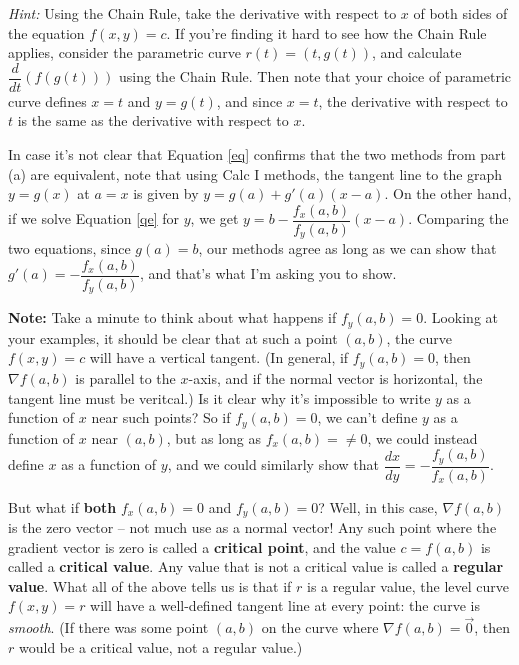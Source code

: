 \documentclass[letterpaper,12pt]{article}
\begin{document}
\begin{enumerate}
\begin{enumerate}
\medskip

{\em Hint:} Using the Chain Rule, take the derivative with respect to $x$ of both sides of the equation $f(x,y)=c$. If you're finding it hard to see how the Chain Rule applies, consider the parametric curve $r(t) = (t,g(t))$, and calculate $\dfrac{d}{dt}(f(g(t)))$ using the Chain Rule. Then note that your choice of parametric curve defines $x=t$ and $y=g(t)$, and since $x=t$, the derivative with respect to $t$ is the same as the derivative with respect to $x$.

\medskip

In case it's not clear that Equation \eqref{eq} confirms that the two methods from part (a) are equivalent, note that using Calc I methods, the tangent line to the graph $y=g(x)$ at $a=x$ is given by $y=g(a) + g'(a)(x-a)$. On the other hand, if we solve Equation \eqref{qe} for $y$, we get $y = b-\dfrac{f_x(a,b)}{f_y(a,b)}(x-a)$. Comparing the two equations, since $g(a)=b$, our methods agree as long as we can show that $g'(a) = -\dfrac{f_x(a,b)}{f_y(a,b)}$, and that's what I'm asking you to show.
\end{enumerate}
\newpage

{\bf Note:} Take a minute to think about what happens if $f_y(a,b)=0$. Looking at your examples, it should be clear that at such a point $(a,b)$, the curve $f(x,y)=c$ will have a vertical tangent. (In general, if $f_y(a,b)=0$, then $\nabla f(a,b)$ is parallel to the $x$-axis, and if the normal vector is horizontal, the tangent line must be veritcal.) Is it clear why it's impossible to write $y$ as a function of $x$ near such points? So if $f_y(a,b)=0$, we can't define $y$ as a function of $x$ near $(a,b)$, but as long as $f_x(a,b)=\neq 0$, we could instead define $x$ as a function of $y$, and we could similarly show that $\dfrac{dx}{dy} = -\dfrac{f_y(a,b)}{f_x(a,b)}$.

But what if {\bf both} $f_x(a,b)=0$ and $f_y(a,b)=0$? Well, in this case, $\nabla f(a,b)$ is the zero vector -- not much use as a normal vector! Any such point where the gradient vector is zero is called a {\bf critical point}, and the value $c=f(a,b)$ is called a {\bf critical value}. Any value that is not a critical value is called a {\bf regular value}. What all of the above tells us is that if $r$ is a regular value, the level curve $f(x,y)=r$ will have a well-defined tangent line at every point: the curve is {\em smooth}. (If there was some point $(a,b)$ on the curve where $\nabla f(a,b)=\vec{0}$, then $r$ would be a critical value, not a regular value.)


\end{enumerate}
\end{document}
